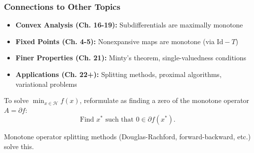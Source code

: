 \documentclass[aspectratio=169,10pt]{beamer}
\newcommand{\Id}{\mathrm{Id}}
\newcommand{\Hilbert}{\mathcal{H}}
\begin{document}
\begin{frame}
    \frametitle{Connections to Other Topics}

    \begin{itemize}
        \item \textbf{Convex Analysis (Ch. 16-19):} Subdifferentials are maximally monotone
        \item \textbf{Fixed Points (Ch. 4-5):} Nonexpansive maps are monotone (via $\Id - T$)
        \item \textbf{Finer Properties (Ch. 21):} Minty's theorem, single-valuedness conditions
        \item \textbf{Applications (Ch. 22+):} Splitting methods, proximal algorithms, variational problems
    \end{itemize}

    \vspace{2em}

    \begin{example}
        To solve $\min_{x \in \Hilbert} f(x)$, reformulate as finding a zero of the monotone operator
        $A = \partial f$:
        \[
            \text{Find } x^* \text{ such that } 0 \in \partial f(x^*).
        \]

        Monotone operator splitting methods (Douglas-Rachford, forward-backward, etc.) solve this.
    \end{example}
\end{frame}
\end{document}
